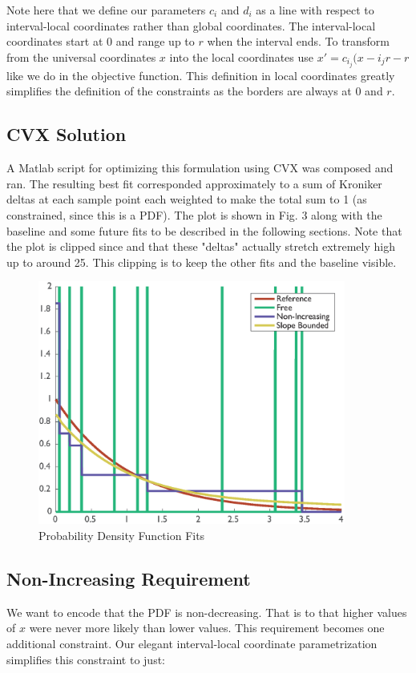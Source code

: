 \documentclass[a4paper]{article}
\begin{document}
Note here that we define our parameters $c_i$ and $d_i$ as a line with respect to interval-local coordinates rather than global coordinates.
The interval-local coordinates start at 0 and range up to $r$ when the interval ends.
To transform from the universal coordinates $x$ into the local coordinates use $x' = c_{i_j}(x - i_j r - r$ like we do in the objective function.
This definition in local coordinates greatly simplifies the definition of the constraints as the borders are always at 0 and $r$.

\subsection{CVX Solution}
A Matlab script for optimizing this formulation using CVX was composed and ran.
The resulting best fit corresponded approximately to a sum of Kroniker deltas at each sample point each weighted to make the total sum to 1 (as constrained, since this is a PDF).
The plot is shown in Fig. 3 along with the baseline and some future fits to be described in the following sections.
Note that the plot is clipped since and that these "deltas"  actually stretch extremely high up to around 25.
This clipping is to keep the other fits and the baseline visible.

\begin{figure}[ht!]
\centering
\includegraphics[width=0.9\textwidth]{Question3f.eps}
\caption{Probability Density Function Fits}
\end{figure}

\subsection{Non-Increasing Requirement}
We want to encode that the PDF is non-decreasing.
That is to that higher values of $x$ were never more likely than lower values.
This requirement becomes one additional constraint.
Our elegant interval-local coordinate parametrization simplifies this constraint to just:
\end{document}
